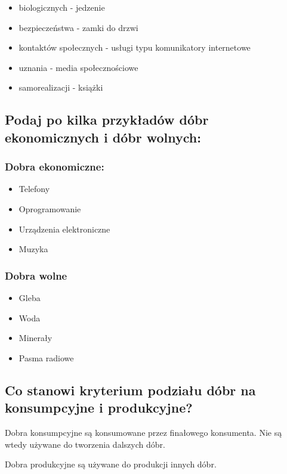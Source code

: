 \documentclass[a4paper,12pt]{article}
\begin{document}
\begin{itemize}
	\item biologicznych - jedzenie
	\item bezpieczeństwa - zamki do drzwi
	\item kontaktów społecznych - usługi typu komunikatory internetowe
	\item uznania - media społecznościowe
	\item samorealizacji - książki
\end{itemize}

\subsection{Podaj po kilka przykładów dóbr ekonomicznych i dóbr wolnych:}

\subsubsection*{Dobra ekonomiczne:}

\begin{itemize}
	\item Telefony
	\item Oprogramowanie
	\item Urządzenia elektroniczne
	\item Muzyka
\end{itemize}

\subsubsection*{Dobra wolne}

\begin{itemize}
	\item Gleba
	\item Woda
	\item Minerały
	\item Pasma radiowe
\end{itemize}

\subsection{Co stanowi kryterium podziału dóbr na konsumpcyjne i produkcyjne?}

Dobra konsumpcyjne są konsumowane przez finałowego konsumenta. Nie są wtedy używane do tworzenia dalszych dóbr.

Dobra produkcyjne są używane do produkcji innych dóbr.
\end{document}
